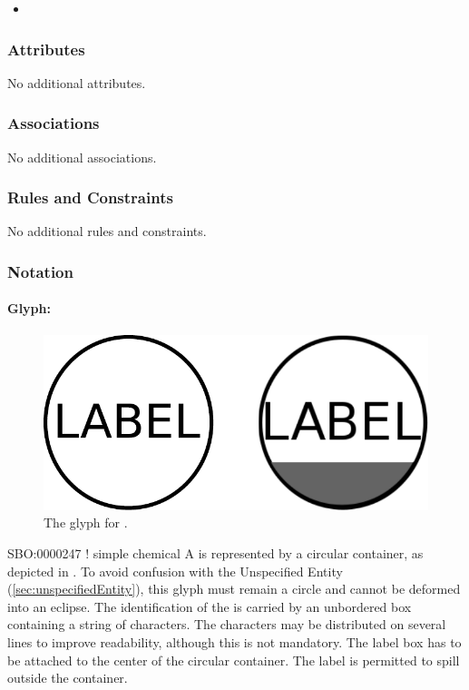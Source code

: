 \begin{itemize}
\item {}
\end{itemize}

\subsubsection{Attributes}

No additional attributes.

\subsubsection{Associations}

No additional associations.

\subsubsection{Rules and Constraints}

No additional rules and constraints.

\subsubsection{Notation}

\paragraph{Glyph: }

\begin{figure}[htb]
  \centering
  \includegraphics[scale = 0.3]{images/simpleChemical}
  \caption{The \PD glyph for .}
  \label{fig:simpleChemical}
\end{figure}

\begin{glyphDescription}
\glyphSboTerm SBO:0000247 ! simple chemical
\glyphContainer A  is represented by a circular
container, as depicted in . To avoid confusion
with the Unspecified Entity (\ref{sec:unspecifiedEntity}), this glyph
must remain a circle and cannot be deformed into an eclipse.
\glyphLabel The identification of the  is carried by an unbordered box containing a string of characters.  The characters may be distributed on several lines to improve readability, although this is not mandatory.  The label box has to be attached to the center of the circular container.  The label is permitted to spill outside the container.
\glyphAux 
\end{glyphDescription}

